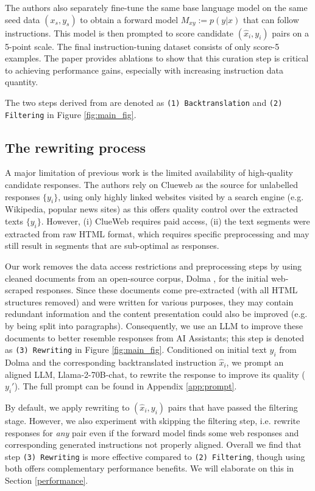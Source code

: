 The authors also separately fine-tune the same base language model on the same seed data ${(x_s, y_s)}$ to obtain a forward model $M_{xy} := p(y|x)$ that can follow instructions. This model is then prompted to score candidate ${(\hat{x}_i, y_i)}$ pairs on a 5-point scale. The final instruction-tuning dataset consists of only score-5 examples. The paper provides ablations to show that this curation step is critical to achieving performance gains, especially with increasing instruction data quantity.

The two steps derived from \citet{li2023self} are denoted as \texttt{(1) Backtranslation} and \texttt{(2) Filtering} in Figure \ref{fig:main_fig}.
\vspace{-0.25em}
\subsection{The rewriting process}
A major limitation of previous work \cite{li2023self} 
is the limited availability of high-quality candidate responses. The authors rely on Clueweb \cite{overwijk2022clueweb22} as the source for unlabelled responses $\{y_i\}$, using only highly linked websites visited by a search engine (e.g. Wikipedia, popular news sites) as this offers quality control over the extracted texts $\{y_i\}$. However, (i) ClueWeb requires paid access, (ii) the text segments were extracted from raw HTML format, which requires specific preprocessing and may still result in segments that are sub-optimal as responses.

Our work removes the data access restrictions and preprocessing steps by using cleaned documents from an open-source corpus, Dolma \cite{dolma}, for the initial web-scraped responses. Since these documents come pre-extracted (with all HTML structures removed) and were written for various purposes, they may contain redundant information and the content presentation could also be improved (e.g. by being split into paragraphs). Consequently, we use an LLM to improve these documents to better resemble responses from AI Assistants; this step is denoted as \texttt{(3) Rewriting} in Figure \ref{fig:main_fig}. Conditioned on initial text $y_i$ from Dolma and the corresponding backtranslated instruction $\hat{x}_i$, we prompt an aligned LLM, Llama-2-70B-chat, to rewrite the response to improve its quality ($y_i'$). The full prompt can be found in Appendix \ref{app:prompt}. 

By default, we apply rewriting to ${(\hat{x}_i, y_i)}$ pairs that have passed the filtering stage. However, we also experiment with skipping the filtering step, i.e. rewrite responses for \textit{any} pair even if the forward model finds some web responses and corresponding generated instructions not properly aligned. Overall we find that step \texttt{(3) Rewriting} is more effective compared to \texttt{(2) Filtering}, though using both offers complementary performance benefits. We will elaborate on this in Section \ref{performance}.

